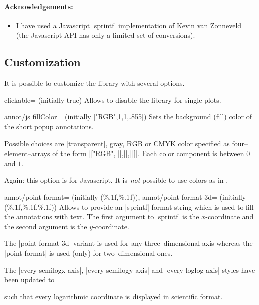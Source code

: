 	\paragraph{Acknowledgements:}
	\begin{itemize}
		\item I have used a Javascript |sprintf| implementation of Kevin van Zonneveld~\cite{phptojs} (the Javascript API has only a limited set of conversions).
	\end{itemize}


\subsection{Customization}
It is possible to customize the library with several options.

\begin{pgfplotskey}{clickable= (initially true)}
	Allows to disable the library for single plots.
\end{pgfplotskey}

\begin{pgfplotskey}{annot/js fillColor= (initially ["RGB",1,1,.855])}
	Sets the background (fill) color of the short popup annotations.
	
	Possible choices are |transparent|, gray, RGB or CMYK color specified as four--element--arrays of the form
	|["RGB", ||,||,||]|. Each color component is between $0$ and $1$.

	Again: this option is for Javascript. It is \emph{not} possible to use colors as in \pgfname.
\end{pgfplotskey}

\begin{pgfplotskeylist}{%
	annot/point format= (initially {(\%.1f,\%.1f)}),
	annot/point format 3d= (initially {(\%.1f,\%.1f,\%.1f)})}
	Allows to provide an |sprintf| format string which is used to fill the annotations with text.
	The first argument to |sprintf| is the $x$-coordinate and the second argument is the $y$-coordinate.

	The |point format 3d| variant is used for any three--dimensional axis whereas the |point format| is used (only) for two--dimensional ones.

	The |every semilogx axis|, |every semilogy axis| and |every loglog axis| styles have been updated to
\begin{codeexample}
\end{codeexample}
	\noindent such that every logarithmic coordinate is displayed in scientific format.
\end{pgfplotskeylist}

